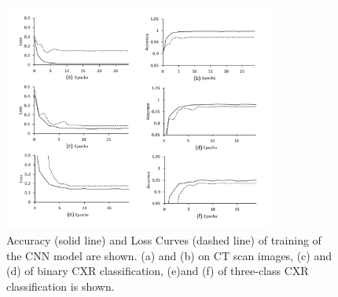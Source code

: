 \documentclass[10pt,journal,compsoc]{IEEEtran}
\begin{document}
\begin{figure}[!t]
\centering
\includegraphics[width=3.5in]{epoch.jpg}
\caption{Accuracy (solid line) and Loss Curves (dashed line) of training of the CNN model are shown. (a) and (b) on CT scan images, (c) and (d) of binary CXR classification, (e)and (f) of three-class CXR classification is shown.}
\label{fig_2}
\end{figure}
\end{document}
